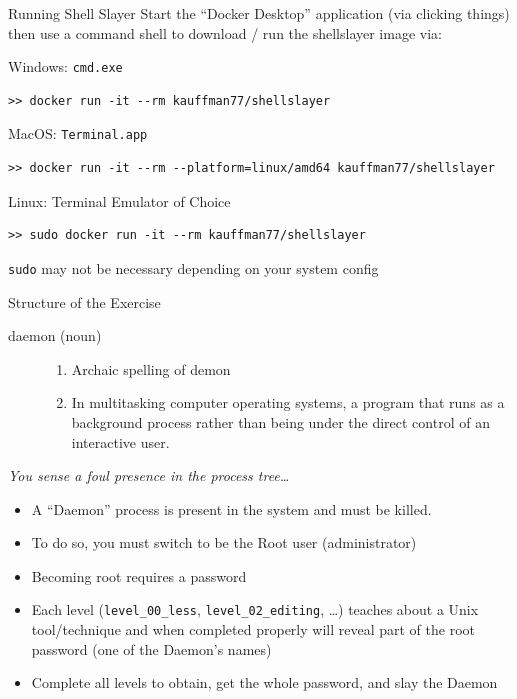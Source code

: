 \documentclass[mathserif]{beamer}
\begin{document}
\begin{frame}[label={sec:orgd294110},fragile]{Running Shell Slayer}
 Start the ``Docker Desktop'' application (via clicking things) then use
a command shell to download / run the shellslayer image via:

\footnotesize
\begin{block}{Windows: \texttt{cmd.exe}}
\begin{verbatim}
>> docker run -it --rm kauffman77/shellslayer
\end{verbatim}
\end{block}

\begin{block}{MacOS: \texttt{Terminal.app}}
\begin{verbatim}
>> docker run -it --rm --platform=linux/amd64 kauffman77/shellslayer
\end{verbatim}
\end{block}

\begin{block}{Linux: Terminal Emulator of Choice}
\begin{verbatim}
>> sudo docker run -it --rm kauffman77/shellslayer
\end{verbatim}
\texttt{sudo} may not be necessary depending on your system config
\end{block}
\end{frame}

\begin{frame}[label={sec:org96991d2},fragile]{Structure of the Exercise}
 \begin{description}
\item[{daemon (noun)}] \begin{enumerate}
\item Archaic spelling of demon
\item In multitasking computer operating systems, a program that runs
as a background process rather than being under the direct
control of an interactive user.
\end{enumerate}
\end{description}

\normalsize
\emph{You sense a foul presence in the process tree\ldots{}}
\begin{itemize}
\item A ``Daemon'' process is present in the system and must be killed.
\item To do so, you must switch to be the Root user (administrator)
\item Becoming root requires a password
\item Each level (\texttt{level\_00\_less}, \texttt{level\_02\_editing}, \ldots{}) teaches about
a Unix tool/technique and when completed properly will reveal part
of the root password (one of the Daemon's names)
\item Complete all levels to obtain, get the whole password, and slay the
Daemon
\end{itemize}
\end{frame}
\end{document}
